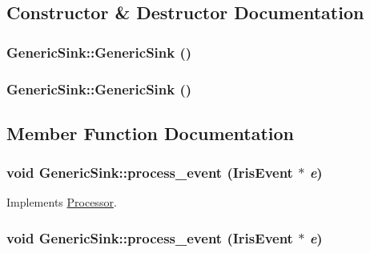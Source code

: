 \subsection{Constructor \& Destructor Documentation}
\hypertarget{classGenericSink_6652e97f87a0a6a93dc979a167d2db8b}{
\subsubsection[{GenericSink}]{\setlength{\rightskip}{0pt plus 5cm}GenericSink::GenericSink ()}}
\label{classGenericSink_6652e97f87a0a6a93dc979a167d2db8b}


\hypertarget{classGenericSink_6652e97f87a0a6a93dc979a167d2db8b}{
\subsubsection[{GenericSink}]{\setlength{\rightskip}{0pt plus 5cm}GenericSink::GenericSink ()}}
\label{classGenericSink_6652e97f87a0a6a93dc979a167d2db8b}




\subsection{Member Function Documentation}
\hypertarget{classGenericSink_a0beb58f52adfe869ba47f4b51537409}{
\subsubsection[{process\_\-event}]{\setlength{\rightskip}{0pt plus 5cm}void GenericSink::process\_\-event ({\bf IrisEvent} $\ast$ {\em e})}}
\label{classGenericSink_a0beb58f52adfe869ba47f4b51537409}




Implements \hyperlink{classProcessor_18cdeefafbd8225cb3ad18dd098c0e08}{Processor}.\hypertarget{classGenericSink_a0beb58f52adfe869ba47f4b51537409}{
\subsubsection[{process\_\-event}]{\setlength{\rightskip}{0pt plus 5cm}void GenericSink::process\_\-event ({\bf IrisEvent} $\ast$ {\em e})}}
\label{classGenericSink_a0beb58f52adfe869ba47f4b51537409}




